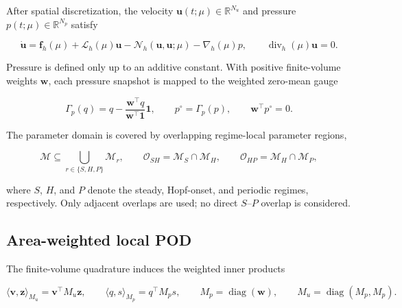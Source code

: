 \documentclass{article}
\begin{document}
After spatial discretization, the velocity
$\bm u(t;\mu)\in\mathbb R^{N_u}$ and pressure
$p(t;\mu)\in\mathbb R^{N_p}$ satisfy


\begin{equation}
    \dot{\bm u}
    =
    \bm f_h(\mu)
    +\mathcal L_h(\mu)\bm u
    -\mathcal N_h(\bm u,\bm u;\mu)
    -\nabla_h(\mu)p,
    \qquad
    \operatorname{div}_h(\mu)\bm u=0.
    \label{eq:app_fom}
\end{equation}


Pressure is defined only up to an additive constant.
With positive finite-volume weights $\bm w$, each pressure snapshot is mapped
to the weighted zero-mean gauge


\begin{equation}
    \Gamma_p(q)
    =
    q-\frac{\bm w^\top q}{\bm w^\top\bm 1}\bm 1,
    \qquad
    p^\circ=\Gamma_p(p),
    \qquad
    \bm w^\top p^\circ=0.
    \label{eq:app_pressure_gauge}
\end{equation}



The parameter domain is covered by overlapping regime-local parameter regions,


\begin{equation}
    \mathcal M
    \subseteq
    \bigcup_{r\in\{S,H,P\}}\mathcal M_r,
    \qquad
    \mathcal O_{SH}
    =
    \mathcal M_S\cap\mathcal M_H,
    \qquad
    \mathcal O_{HP}
    =
    \mathcal M_H\cap\mathcal M_P,
    \label{eq:app_regime_cover}
\end{equation}


where $S$, $H$, and $P$ denote the steady, Hopf-onset, and periodic
regimes, respectively.
Only adjacent overlaps are used; no direct $S$--$P$ overlap is considered.


\subsection{Area-weighted local POD}

The finite-volume quadrature induces the weighted inner products


\begin{equation}
    \langle\bm v,\bm z\rangle_{M_u}
    =
    \bm v^\top M_u\bm z,
    \qquad
    \langle q,s\rangle_{M_p}
    =
    q^\top M_p s,
    \qquad
    M_p=\operatorname{diag}(\bm w),
    \qquad
    M_u=\operatorname{diag}(M_p,M_p).
    \label{eq:app_weighted_inner_products}
\end{equation}
\end{document}
